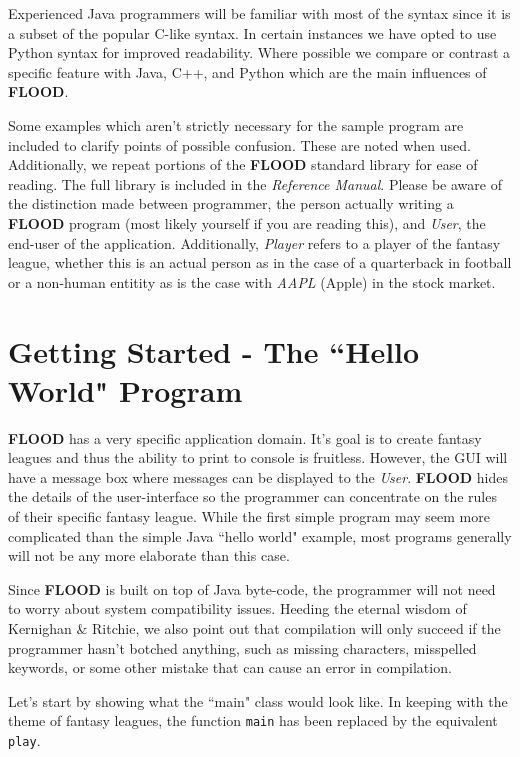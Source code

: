\documentclass[12pt]{report}
\begin{document}
Experienced Java programmers will be familiar with most of the syntax since it is a subset of the popular C-like syntax. In certain instances we have opted to use Python syntax for improved readability. Where possible we compare or contrast a specific feature with Java, C++, and Python which are the main influences of \textbf{FLOOD}. 

Some examples which aren't strictly necessary for the sample program are included to clarify points of possible confusion. These are noted when used. Additionally, we repeat portions of the \textbf{FLOOD} standard library for ease of reading. The full library is included in the \textit{Reference Manual}. Please be aware of the distinction made between programmer, the person actually writing a \textbf{FLOOD} program (most likely yourself if you are reading this), and \textit{User}, the end-user of the application. Additionally, \textit{Player} refers to a player of the fantasy league, whether this is an actual person as in the case of a quarterback in football or a non-human entitity as is the case with \textit{AAPL} (Apple) in the stock market.

\section{Getting Started - The ``Hello World" Program}

\textbf{FLOOD} has a very specific application domain. It's goal is to create fantasy leagues and thus the ability to print to console is fruitless. However, the GUI will have a message box where messages can be displayed to the \textit{User}. \textbf{FLOOD} hides the details of the user-interface so the programmer can concentrate on the rules of their specific fantasy league. While the first simple program may seem more complicated than the simple Java ``hello world" example, most programs generally will not be any more elaborate than this case.

Since \textbf{FLOOD} is built on top of Java byte-code, the programmer will not need to worry about system compatibility issues. Heeding the eternal wisdom of Kernighan \& Ritchie, we also point out that compilation will only succeed if the programmer hasn't botched anything, such as missing characters, misspelled keywords, or some other mistake that can cause an error in compilation. 

Let's start by showing what the ``main" class would look like. In keeping with the theme of fantasy leagues, the function \texttt{main} has been replaced by the equivalent \texttt{play}. 
\end{document}
